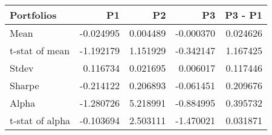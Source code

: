 \begin{tabular}{lrrrr}
\toprule
Portfolios & P1 & P2 & P3 & P3 - P1 \\
\midrule
Mean & -0.024995 & 0.004489 & -0.000370 & 0.024626 \\
t-stat of mean & -1.192179 & 1.151929 & -0.342147 & 1.167425 \\
Stdev & 0.116734 & 0.021695 & 0.006017 & 0.117446 \\
Sharpe & -0.214122 & 0.206893 & -0.061451 & 0.209676 \\
Alpha & -1.280726 & 5.218991 & -0.884995 & 0.395732 \\
t-stat of alpha & -0.103694 & 2.503111 & -1.470021 & 0.031871 \\
\bottomrule
\end{tabular}
